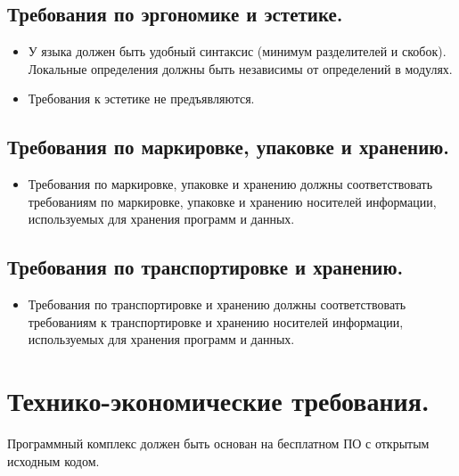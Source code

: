 \documentclass[12pt,a4paper,oneside]{extarticle}
\begin{document}
    \subsection{Требования по эргономике и эстетике.}
        \begin{itemize}
            \item У языка должен быть удобный синтаксис (минимум разделителей и скобок). Локальные определения должны быть независимы от определений в модулях.
            \item Требования к эстетике не предъявляются.
        \end{itemize}
    \subsection{Требования по маркировке, упаковке и хранению.}
        \begin{itemize}
            \item Требования по маркировке, упаковке и хранению должны соответствовать требованиям по маркировке, упаковке и хранению носителей информации, используемых для хранения программ и данных.
        \end{itemize}
    \subsection{Требования по транспортировке и хранению.}
        \begin{itemize}
            \item Требования по транспортировке и хранению должны соответствовать требованиям к транспортировке и хранению носителей информации, используемых для хранения программ и данных.
        \end{itemize}
\section{Технико-экономические требования.}
    Программный комплекс должен быть основан на бесплатном ПО с открытым исходным кодом.
\end{document}
